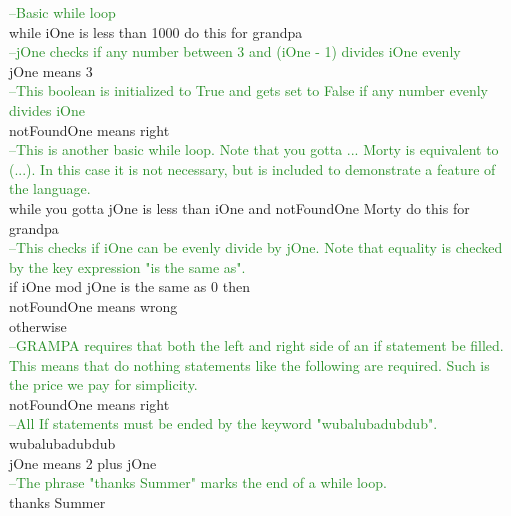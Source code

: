 \documentclass[preprint]{sigplanconf}
\begin{document}
{\textcolor{ForestGreen}{  --Basic while loop} \\
\indent while iOne is less than 1000 do this for grandpa \\

\textcolor{ForestGreen}{    --jOne checks if any number between 3 and (iOne - 1) divides iOne evenly} \\
\indent \indent jOne means 3 \\

\textcolor{ForestGreen}{    --This boolean is initialized to True and gets set to False if any number evenly divides iOne} \\
\indent \indent notFoundOne means right \\

\textcolor{ForestGreen}{    --This is another basic while loop. Note that you gotta ... Morty is equivalent to (...). In this case it is not necessary, but is included to demonstrate a feature of the language.} \\
\indent \indent while you gotta jOne is less than iOne and notFoundOne Morty do this for grandpa \\

\textcolor{ForestGreen}{      --This checks if iOne can be evenly divide by jOne. Note that equality is checked by the key expression "is the same as".} \\
\indent \indent \indent if iOne mod jOne is the same as 0 then \\
\indent \indent \indent \indent notFoundOne means wrong \\
\indent \indent \indent otherwise \\
\textcolor{ForestGreen}{        --GRAMPA requires that both the left and right side of an if statement be filled. This means that do nothing statements like the following are required. Such is the price we pay for simplicity.} \\
\indent \indent \indent \indent notFoundOne means right \\
\textcolor{ForestGreen}{      --All If statements must be ended by the keyword "wubalubadubdub".} \\
\indent \indent \indent wubalubadubdub \\

\indent \indent \indent \noindent jOne means 2 plus jOne \\

\textcolor{ForestGreen}{    --The phrase "thanks Summer" marks the end of a while loop.} \\
\indent \indent thanks Summer \\

}
\end{document}
